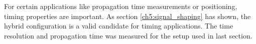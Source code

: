 For certain applications like propagation time measurements or positioning, timing properties are important. As section \ref{ch5:signal_shaping} has shown, the hybrid configuration is a valid candidate for timing applications. The time resolution and propagation time was measured for the setup used in last section. \par 
\begin{figure}[h!]
	\hfill
	\hfill

\end{figure}
